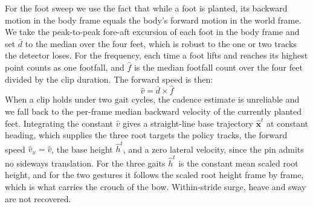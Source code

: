 \documentclass[letterpaper, 10 pt, conference]{ieeeconf}
\newcommand{\averageFootDisplacement}{\bar{d}}
\newcommand{\averageGaitCycle}{\hat{f}}
\begin{document}
For the foot sweep we use the fact that while a foot is planted, its backward motion in the body frame equals the body's forward motion in the world frame. We take the peak-to-peak fore-aft excursion of each foot in the body frame and set $\averageFootDisplacement$ to the median over the four feet, which is robust to the one or two tracks the detector loses. For the frequency, each time a foot lifts and reaches its highest point counts as one footfall, and $\averageGaitCycle$ is the median footfall count over the four feet divided by the clip duration. The forward speed is then:
\begin{equation}
\hat{v} = \averageFootDisplacement \times \averageGaitCycle
\label{equ:forward-speed}
\end{equation}
When a clip holds under two gait cycles, the cadence estimate is unreliable and we fall back to the per-frame median backward velocity of the currently planted feet. Integrating the constant $\hat v$ gives a straight-line base trajectory $\hat{\mathbf{x}}^t$ at constant heading, which supplies the three root targets the policy tracks, the forward speed $\hat v_x{=}\hat v$, the base height $\hat h^t$, and a zero lateral velocity, since the pin admits no sideways translation. For the three gaits $\hat h^t$ is the constant mean scaled root height, and for the two gestures it follows the scaled root height frame by frame, which is what carries the crouch of the bow. Within-stride surge, heave and sway are not recovered.
\end{document}
